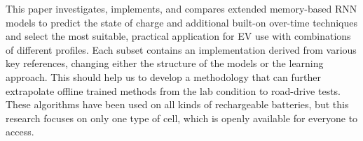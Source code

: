 %
%
%
%
%
 {
    This paper investigates, implements, and compares extended memory-based RNN models to predict the state of charge and additional built-on over-time techniques and select the most suitable, practical application for EV use with combinations of different profiles.
}
Each subset contains an implementation derived from various key references, changing either the structure of the models or the learning approach.
This should help us to develop a methodology that can further extrapolate offline trained methods from the lab condition to road-drive tests.
These algorithms have been used on all kinds of rechargeable batteries, but this research focuses on only one type of cell, which is openly available for everyone to access.
